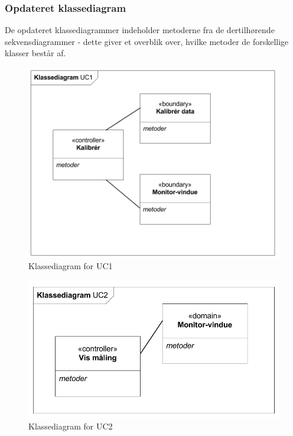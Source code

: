 \subsubsection{Opdateret klassediagram}
De opdateret klassediagrammer indeholder metoderne fra de dertilhørende  sekvensdiagrammer - dette giver et overblik over, hvilke metoder de forskellige klasser består af.

\begin{figure}[H]
	\centering
	\includegraphics[width=1\textwidth]{Figurer/Snip20151104_37}
	\caption{Klassediagram for UC1}
\end{figure}
 

\begin{figure}[H]
	\centering
	\includegraphics[width=1\textwidth]{Figurer/Snip20151104_38}
	\caption{Klassediagram for UC2}
\end{figure}

